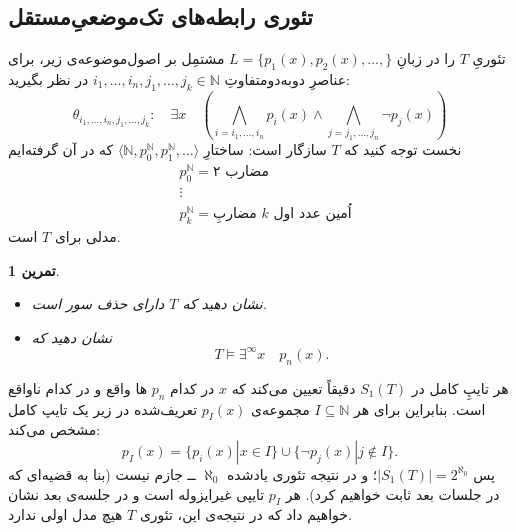 \documentclass[12pt,a4paper]{article}
\theoremstyle{colorhead}
\newtheorem{tam}[thm]{تمرین}
\begin{document}
\subsection{تئوری رابطه‌های تک‌موضعیِ‌مستقل}
تئوریِ
$T$
را در زبانِ
$L=\{p_1(x),p_2(x),\ldots,\}$
مشتمِل بر اصول‌موضوعه‌ی زیر، برای عناصرِ دوبه‌دومتفاوتِ
$i_1,\ldots,i_n, j_1,\ldots,j_k\in \mathbb{N}$
در نظر بگیرید:
\[
\theta_{i_1,\ldots,i_n,j_1,\ldots,j_k}:\quad \exists x\quad \left( \bigwedge_{i=i_1,\ldots,i_n} p_i(x) \wedge \bigwedge_{j=j_1,\ldots, j_n} \neg p_j(x)\right)
\]
نخست توجه کنید که
$T$
سازگار است: ساختارِ
$\langle \mathbb{N}, p_0^\mathbb{N},p_1^\mathbb{N},\ldots\rangle$
که در آن گرفته‌ایم
\begin{align*}
& p_0^\mathbb{N}=\text{مضارب ۲}
\\
& 
\vdots \\
& 
p_k^\mathbb{N}=\text{مضاربِ $k$ اُمین عدد اول}
\end{align*}
مدلی برای
$T$
است. 
\begin{tam}\hfill 
\begin{itemize}
\item 
نشان دهید که
$T$
دارای حذف سور است.
\item 
نشان دهید که 
\[
T\models \exists^{\infty } x\quad  p_n(x).
\]
\end{itemize}
\end{tam}
هر تایپِ کامل در
$S_1(T)$
دقیقاً تعیین می‌کند که 
$x$
در کدام
$p_n$
ها
واقع و در کدام ناواقع است. بنابراین برای هر
$I\subseteq \mathbb{N}$
مجموعه‌ی
$p_I(x)$
تعریف‌شده در زیر یک تایپ کامل مشخص می‌کند:
\[
p_I(x)=\{p_i(x)|x\in I\} \cup \{\neg p_j(x)|j\not\in I\}.
\]
پس
$|S_1(T)|=2^{\aleph_0}$؛
و در نتیجه تئوری یادشده 
$\aleph_0$ ــ
جازم نیست (بنا به قضیه‌ای که در جلسات بعد ثابت خواهیم کرد).
هر
$p_I$
تایپی غیرایزوله است و در جلسه‌ی بعد نشان خواهیم داد که در نتیجه‌ی
این، تئوری
$T$
هیچ مدل اولی ندارد. 
\end{document}
